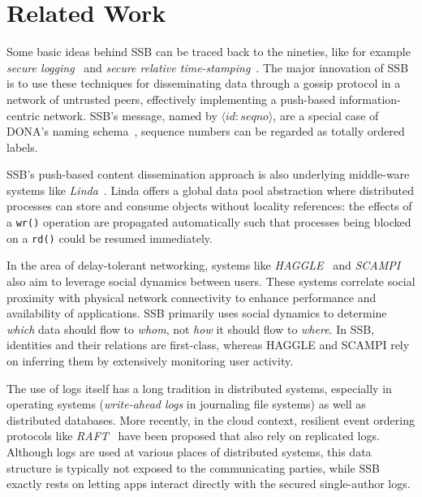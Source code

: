\documentclass[9pt,sigconf]{acmart}
\begin{document}
\section{Related Work}
\label{sect:relwork}

Some basic ideas behind SSB can be traced back to the nineties, like
for example {\em secure logging}~\cite{schneier1998cryptographic} and {\em secure
relative time-stamping}~\cite{haber1990time}. The major innovation of
SSB is to use these techniques for disseminating data through a gossip
protocol in a network of untrusted peers, effectively implementing a
push-based information-centric network. SSB's message, named by $\langle id:seqno\rangle$, are a special case of DONA's naming schema~\cite{Koponen:2007:DNA:1282380.1282402}, sequence numbers can be regarded as totally ordered labels.

SSB's push-based content dissemination approach is also
underlying middle-ware systems like
{\em Linda}~\cite{Gelernter:1985:GCL:2363.2433}. Linda offers a global data
pool abstraction where distributed processes can store and consume
objects without locality references: the effects of a {\tt wr()}
operation are propagated automatically such that processes being
blocked on a {\tt rd()} could be resumed immediately.

In the area of delay-tolerant networking, systems like {\em HAGGLE}~\cite{scott2006haggle} and {\em SCAMPI}~\cite{pitkanen2012scampi} also aim to leverage social dynamics between users. These systems correlate social proximity with physical network connectivity to enhance performance and availability of applications. SSB primarily uses social dynamics to determine {\em which} data should flow to {\em whom}, not {\em how} it should flow to {\em where}. In SSB, identities and their relations are first-class, whereas HAGGLE and SCAMPI rely on inferring them by extensively monitoring user activity.

The use of logs itself has a long tradition in distributed systems,
especially in operating systems ({\em write-ahead logs} in journaling file
systems) as well as distributed databases. More recently, in the cloud
context, resilient event ordering protocols like
{\em RAFT}~\cite{DBLP:conf/usenix/OngaroO14} have been proposed that also
rely on replicated logs. Although logs are used at various places of
distributed systems, this data structure is typically not exposed to
the communicating parties, while SSB exactly rests on letting apps
interact directly with the secured single-author logs.
\end{document}
